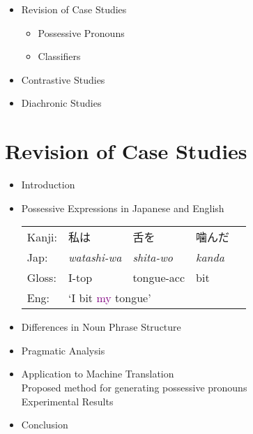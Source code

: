 \documentclass[a4paper,landscape,headrule,footrule,xetex]{foils}
\newcommand{\psp}[1]{\textcolor{purple}{#1}}
\begin{document}

\maketitle



\begin{itemize} 
\item Revision of Case Studies
  \begin{itemize} 
  \item Possessive Pronouns
  \item Classifiers
  \end{itemize}
\item Contrastive Studies
\item Diachronic Studies
\end{itemize}



\section{Revision of Case Studies}

\begin{itemize}\addtolength{\itemsep}{-5mm}
\item Introduction

\item Possessive Expressions in Japanese and English
  \makexeCJKactive
 \begin{exe}
   \ex
    \begin{tabular}[t]{lllll}
      Kanji: &  私は &  舌を &  噛んだ\\
      Jap:   &  \sl watashi-wa &  \sl shita-wo & \sl kanda\\
      Gloss: &   I-{\sc top} &  tongue-{\sc acc} &  bit  \\
      Eng:   & \multicolumn{4}{l}{`I bit \psp{my} tongue'}
    \end{tabular}
  \end{exe}
  \makexeCJKinactive
\item Differences in Noun Phrase Structure

\item Pragmatic Analysis 

\item Application to Machine Translation \\
Proposed method for generating possessive pronouns \\
Experimental Results 

\item Conclusion 
\end{itemize}
\end{document}
